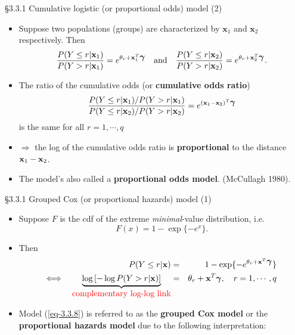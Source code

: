 \documentclass{beamer}
\newenvironment{wideitemize}%
  {\begin{itemize}%
    \setlength{\parskip}{1em}}%
  {\end{itemize}}
\begin{document}
\begin{frame} {\S3.3.1 Cumulative logistic (or proportional odds) model (2)}
\begin{wideitemize}

\item
Suppose two populations (groups) are characterized by $\textbf{x}_1$ and $\textbf{x}_2$ respectively. Then
$$\frac{P(Y\leq r|\textbf{x}_1)}{P(Y> r|\textbf{x}_1)} = e^{\theta_r+\textbf{x}_1^T\mbox{\boldmath $\gamma$}}
\quad\mbox{and}\quad \frac{P(Y\leq r|\textbf{x}_2)}{P(Y> r|\textbf{x}_2)} = e^{\theta_r+
\textbf{x}_2^T\mbox{\boldmath $\gamma$}}.$$
\item The ratio of the cumulative odds (or {\bf cumulative odds ratio})
\[\frac{P(Y\leq r|\textbf{x}_1)/P(Y> r|\textbf{x}_1)}{P(Y\leq r|\textbf{x}_2)/
P(Y> r|\textbf{x}_2)}=e^{(\textbf{x}_1-\textbf{x}_2)^T\mbox{\boldmath $\gamma$}}\]
 is the same for all $r=1,\cdots,q$ 
 
 \item $\Rightarrow$
 the log of  the cumulative odds ratio  is {\bf proportional} to the distance ${\bf x}_1 - {\bf x}_2$. 

\item The model's also called a \textbf{proportional odds model}. (McCullagh 1980). 
\end{wideitemize}
\end{frame}



\begin{frame}{\S3.3.1 Grouped Cox (or proportional hazards) model (1)}
\begin{wideitemize}
\item Suppose $F$ is the cdf of the extreme \emph{minimal}-value distribution, i.e. 
\[
F(x)=1-\exp\{-e^x\}.
\]
\item Then
\begin{eqnarray}
P(Y\leq r|\textbf{x}) &=& 1-\exp\{-e^{\theta_r+\textbf{x}^T\mbox{\boldmath $\gamma$}}\}
\label{eq-3.3.8} \\   \Longleftrightarrow \quad
\underbrace{\log\left[-\log P(Y>r|\textbf{x})\right]}_{\textcolor{red}{\mbox{complementary log-log link}}}
&=& \theta_r+\textbf{x}^T\mbox{\boldmath $\gamma$}, \quad r=1,\cdots,q
\nonumber
\end{eqnarray}
\item 
Model (\ref{eq-3.3.8}) is referred to as the \textbf{grouped Cox model} or the \textbf{proportional 
hazards model} due to the following interpretation:

\end{wideitemize}
\end{frame}
\end{document}
